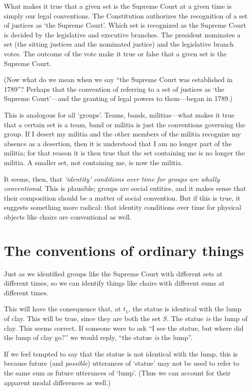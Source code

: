 \documentclass[11pt]{article}
\begin{document}
\begin{spacing}{1.5}
What makes it true that a given set is the Supreme Court at a given
time is simply our legal conventions.  The Constitution authorizes the
recognition of a set of justices as `the Supreme Court'.  Which set is
recognized as the Supreme Court is decided by the legislative and
executive branches.  The president nominates a set (the sitting
justices and the nominated justice) and the legislative branch votes.
The outcome of the vote make it true or false that a given set is the
Supreme Court.

(Now what do we mean when we say ``the Supreme Court was established
in 1789''?  Perhaps that the convention of referring to a set of
justices as `the Supreme Court'---and the granting of legal powers to
them---began in 1789.)

This is analogous for all `groups'.  Teams, bands, militias---what
makes it true that a certain set is a team, band or militia is just
the conventions governing the group.  If I desert my militia and the
other members of the militia recognize my absence as a desertion, then
it is understood that I am no longer part of the militia; for that
reason it is then true that the set containing me is no longer the
militia.  A smaller set, not containing me, is now the militia.

It seems, then, that {\em `identity' conditions over time for groups
  are wholly conventional}.  This is plausible; groups are social
entities, and it makes sense that their composition should be a matter
of social convention.  But if this is true, it suggests something more
radical: that identity conditions over time for physical objects like
chairs are conventional as well.

\section{The conventions of ordinary things}
\label{chair-ref}
Just as we identified groups like the Supreme Court with different
sets at different times, so we can identify things like chairs with
different sums at different times.

This will have the consequence that, at $t_1$, the statue is identical
with the lump of clay.  This will be true, since they are both the set
$S$.  The statue {\em is} the lump of clay.  This seems correct.  If
someone were to ask ``I see the statue, but where did the lump of clay
go?'' we would reply, ``the statue {\em is} the lump''.

If we feel tempted to say that the statue is not identical with the
lump, this is because future (and {\em possible}) utterances of
`statue' may not be used to refer to the same sum as future utterances
of `lump'.  (Thus we can account for their apparent modal differences
as well.)


\end{spacing}
\end{document}
